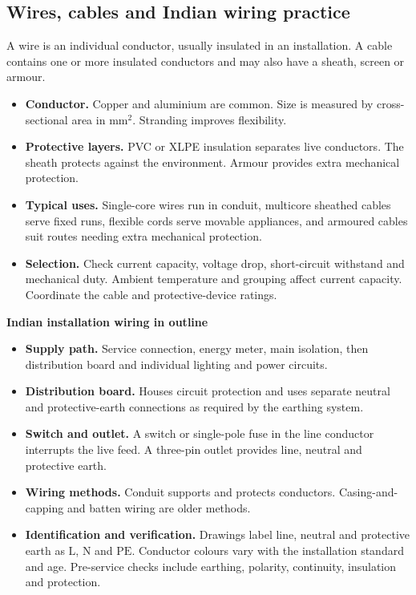 \documentclass[12pt,a4paper]{article}
\begin{document}
\subsection{Wires, cables and Indian wiring practice}

\begin{tcolorbox}[defbox,title={Wire and cable}]
A wire is an individual conductor, usually insulated in an installation. A cable contains one or more insulated conductors and may also have a sheath, screen or armour.
\end{tcolorbox}

\begin{itemize}[leftmargin=*, itemsep=3pt, topsep=4pt]
  \item \textbf{Conductor.} Copper and aluminium are common. Size is measured by cross-sectional area in \(\mathrm{mm^2}\). Stranding improves flexibility.
  \item \textbf{Protective layers.} PVC or XLPE insulation separates live conductors. The sheath protects against the environment. Armour provides extra mechanical protection.
  \item \textbf{Typical uses.} Single-core wires run in conduit, multicore sheathed cables serve fixed runs, flexible cords serve movable appliances, and armoured cables suit routes needing extra mechanical protection.
  \item \textbf{Selection.} Check current capacity, voltage drop, short-circuit withstand and mechanical duty. Ambient temperature and grouping affect current capacity. Coordinate the cable and protective-device ratings.
\end{itemize}

\textbf{Indian installation wiring in outline}
\begin{itemize}[leftmargin=*, itemsep=3pt, topsep=4pt]
  \item \textbf{Supply path.} Service connection, energy meter, main isolation, then distribution board and individual lighting and power circuits.
  \item \textbf{Distribution board.} Houses circuit protection and uses separate neutral and protective-earth connections as required by the earthing system.
  \item \textbf{Switch and outlet.} A switch or single-pole fuse in the line conductor interrupts the live feed. A three-pin outlet provides line, neutral and protective earth.
  \item \textbf{Wiring methods.} Conduit supports and protects conductors. Casing-and-capping and batten wiring are older methods.
  \item \textbf{Identification and verification.} Drawings label line, neutral and protective earth as \(\mathrm{L}\), \(\mathrm{N}\) and \(\mathrm{PE}\). Conductor colours vary with the installation standard and age. Pre-service checks include earthing, polarity, continuity, insulation and protection.
\end{itemize}
\end{document}
